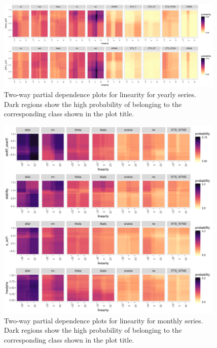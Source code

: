 \documentclass[11pt,a4paper,]{article}
\begin{document}
\begin{figure}[h]

{\centering \includegraphics[width=\textwidth]{figure/y2dpdp-1} 

}

\caption{Two-way partial dependence plots for linearity for yearly series. Dark regions show the high probability of belonging to the corresponding class shown in the plot title.}\label{fig:y2dpdp}
\end{figure}

\begin{figure}[h]

{\centering \includegraphics[width=\textwidth]{figure/m2dpdp-1} 

}

\caption{Two-way partial dependence plots for linearity for monthly series. Dark regions show the high probability of belonging to the corresponding class shown in the plot title.}\label{fig:m2dpdp}
\end{figure}
\end{document}
